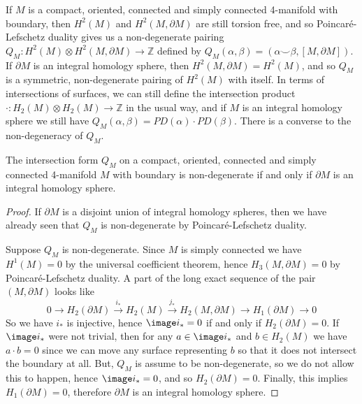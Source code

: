 If $M$ is a compact, oriented, connected and simply connected 4-manifold with boundary, then $H^2(M)$ and $H^2(M,\partial M)$ are still torsion free, and so Poincar\'{e}-Lefschetz duality gives us a non-degenerate pairing $Q_M : H^2(M) \otimes H^2(M,\partial M) \rightarrow \mathbb Z$ defined by $Q_M(\alpha,\beta) = (\alpha \smallsmile \beta,[M,\partial M])$. If $\partial M$ is an integral homology sphere, then $H^2(M,\partial M) = H^2(M)$, and so $Q_M$ is a symmetric, non-degenerate pairing of $H^2(M)$ with itself. In terms of intersections of surfaces, we can still define the intersection product $\cdot : H_2(M) \otimes H_2(M) \rightarrow \mathbb Z$ in the usual way, and if $M$ is an integral homology sphere we still have $Q_M(\alpha,\beta) = PD(\alpha) \cdot PD(\beta)$. There is a converse to the non-degeneracy of $Q_M$.
\begin{prop}
The intersection form $Q_M$ on a compact, oriented, connected and simply connected 4-manifold $M$ with boundary is non-degenerate if and only if $\partial M$ is an integral homology sphere.
\end{prop}
\begin{proof}
If $\partial M$ is a disjoint union of integral homology spheres, then we have already seen that $Q_M$ is non-degenerate by Poincar\'{e}-Lefschetz duality.

Suppose $Q_M$ is non-degenerate. Since $M$ is simply connected we have $H^1(M)=0$ by the universal coefficient theorem, hence $H_3(M,\partial M)=0$ by Poincar\'{e}-Lefschetz duality. A part of the long exact sequence of the pair $(M,\partial M)$ looks like
\[ 0 \longrightarrow H_2(\partial M) \stackrel{i_*}{\longrightarrow} H_2(M) \stackrel{j_*}{\longrightarrow} H_2(M,\partial M) \longrightarrow H_1(\partial M) \longrightarrow 0 \]
So we have $i_*$ is injective, hence $\image i_* = 0$ if and only if $H_2(\partial M)=0$. If $\image i_*$ were not trivial, then for any $a \in \image i_*$ and $b \in H_2(M)$ we have $a \cdot b = 0$ since we can move any surface representing $b$ so that it does not intersect the boundary at all. But, $Q_M$ is assume to be non-degenerate, so we do not allow this to happen, hence $\image i_* = 0$, and so $H_2(\partial M)=0$. Finally, this implies $H_1(\partial M)=0$, therefore $\partial M$ is an integral homology sphere.
\end{proof}

